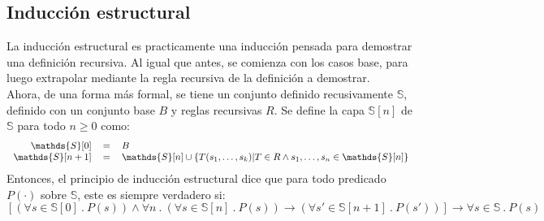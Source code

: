 \documentclass[../main.tex]{subfiles}
\begin{document}
\subsection{Inducción estructural}
La inducción estructural es practicamente una inducción pensada para demostrar una definición recursiva. Al igual que antes, se comienza con los casos base, para luego extrapolar mediante la regla recursiva de la definición a demostrar.\\
Ahora, de una forma más formal, se tiene un conjunto definido recusivamente $\mathds{S}$, definido con un conjunto base $B$ y reglas recursivas $R$. Se define la capa $\mathds{S}[n]$ de $\mathds{S}$ para todo $n \geq 0$ como:
\[
    \begin{tabular}{rcl}
        $\mathds{S}[0]$ & $=$ & $B$\\
        $\mathds{S}[n + 1]$ & $=$ & $\mathds{S}[n] \cup \{ T(s_1, \ldots, s_k) | T \in R \wedge s_1, \ldots, s_n \in \mathds{S}[n] \}$
    \end{tabular}
\]
Entonces, el principio de inducción estructural dice que para todo predicado $P(\cdot)$ sobre $\mathds{S}$, este es siempre verdadero si:
\[ [(\forall s \in \mathds{S}[0]\ .\ P(s)) \wedge \forall n\ .\ (\forall s \in \mathds{S}[n]\ .\ P(s)) \rightarrow (\forall s' \in \mathds{S}[n + 1]\ .\ P(s'))] \rightarrow \forall s \in \mathds{S}\ .\ P(s) \]
\end{document}
